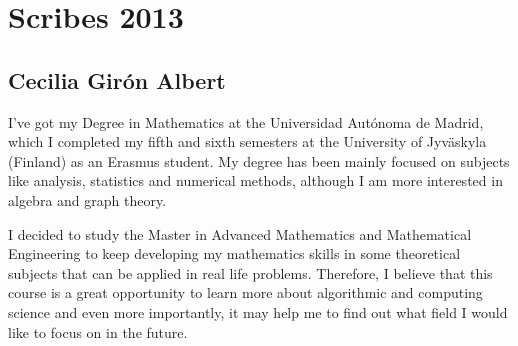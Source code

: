 \chapter*{Scribes 2013}

\section{Cecilia Girón Albert}

I've got my Degree in Mathematics at the Universidad Autónoma de Madrid, which I completed my fifth and sixth semesters 
at the University of Jyväskyla (Finland) as an Erasmus student. My degree has been mainly focused on subjects like 
analysis, statistics and numerical methods, although I am more interested in algebra and graph theory. 

I decided to study the Master in Advanced Mathematics and Mathematical Engineering to keep developing my mathematics skills 
in some theoretical subjects that can be applied in real life problems. Therefore, I believe that this course is a great 
opportunity to learn more about algorithmic and computing science and even more importantly, it may help me to find out 
what field I would like to focus on in the future.


